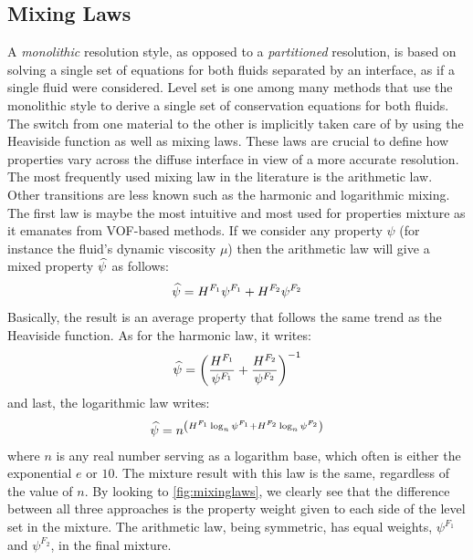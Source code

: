 \subsection{Mixing Laws} 
\label{sec:mixinglaws}
A \emph{monolithic} resolution style, as opposed to a \emph{partitioned} resolution, is based on solving a single set of equations
for both fluids separated by an interface, as if a single fluid were considered. 
Level set is one among many methods that use the monolithic style to derive a single set of conservation equations
for both fluids. The switch from one material to the other is implicitly taken care of by using the Heaviside function as well as mixing laws. 
These laws are crucial to define how properties vary across the diffuse interface in view of a more accurate resolution.
The most frequently used mixing law in the literature is the arithmetic law. Other transitions are less known such as 
the harmonic and logarithmic mixing. The first law is maybe the most intuitive and most used for properties mixture as it emanates
from VOF-based methods. If we consider any property $\psi$ (for instance the fluid's dynamic viscosity $\mu$) then the arithmetic 
law will give a mixed property $\widehat{\psi}$ as follows:
\begin{align}
\label{eq:arithmetic}
\widehat{\psi} = H^{F_1} \psi^{F_1} + H^{F_2} \psi^{F_2}
\end{align}
Basically, the result is an average property that follows the same trend as the Heaviside function. As for the harmonic law, it writes:
\begin{align}
\label{eq:harmonic}
\widehat{\psi} = \left( \frac{H^{F_1}}{\psi^{F_1}} + \frac{H^{F_2}}{\psi^{F_2}}  \right)^{-1}
\end{align}
and last, the logarithmic law writes:
\begin{align}
\label{eq:logarithmic}
\widehat{\psi} =  n^{\left( H^{F_1} \log_n \psi^{F_1} + H^{F_2} \log_n \psi^{F_2} \right)}
\end{align}
where $n$ is any real number serving as a logarithm base, which often is either the exponential $e$ or $10$.
The mixture result with this law is the same, regardless of the value of $n$.
By looking to \cref{fig:mixinglaws}, we clearly see that the difference between all three approaches is the property weight given to each side 
of the level set in the mixture. The arithmetic law, being symmetric, has equal weights, $\psi^{F_1}$ and $\psi^{F_2}$, in the final mixture. 
